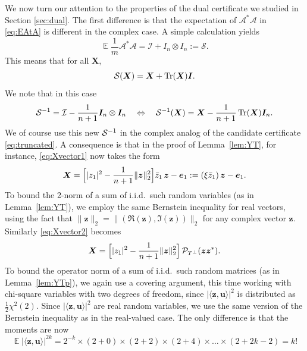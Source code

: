 \documentclass[11pt]{article}
\newcommand{\<}{\langle}
\renewcommand{\>}{\rangle}
\newcommand{\E}{\operatorname{\mathbb{E}}}
\newcommand{\bX}{\bm{X}}
\newcommand{\bI}{\bm{I}}
\newcommand{\bu}{\bm{u}}
\newcommand{\be}{\bm{e}}
\newcommand{\bz}{\bm{z}}
\newcommand{\tr}{\operatorname{Tr}}
\numberwithin{equation}{section}
\newcommand{\cA}{\mathcal{A}}
\begin{document}
We now turn our attention to the properties of the dual certificate we
studied in Section \ref{sec:dual}. The first difference is that the
expectation of $\cA^* \cA$ in \eqref{eq:EAtA} is different in the
complex case. A simple calculation yields
\[
\E \frac{1}{m} \cA^* \cA =  \mathcal{I} + I_n \otimes I_n := \mathcal{S}.
\]
This means that for all $\bX$,
\begin{equation}
\label{eq:SC}
\cS(\bX) = \bX + \tr(\bX) \bI.
\end{equation}
We note that in this case
\begin{equation}
\label{eq:SinvC}
\cS^{-1} = \mathcal{I} - \frac{1}{n+1} \bI_n \otimes \bI_n
\quad \Leftrightarrow \quad \cS^{-1}(\bX) =  \bX -
\frac{1}{n+1} \tr(\bX) \bI_n.
\end{equation}
We of course use this new $\mathcal{S}^{-1}$ in the complex analog of the
candidate certificate \eqref{eq:truncated}.  A consequence is that
in the proof of Lemma~\ref{lem:YT}, for instance, \eqref{eq:Xvector1}
now takes the form
\begin{equation}
\label{eqLXvector1C}
\bX =   \Bigl[|z_1|^2 - \frac{1}{n+1} \|\bz\|_2^2\Bigr] \bar{z}_1 \,  \bz -
\be_1
:= (\xi \bar{z}_1)\, \bz - \be_1.
\end{equation}
To bound the 2-norm of a sum of i.i.d.\ such random variables (as in Lemma~\ref{lem:YT}), we employ the same Bernstein inequality for real vectors, 
using the fact that $\|\bz\|_2 = \|(\Re(\bz),\Im(\bz))\|_2$ for any complex
vector $\bz$.
Similarly \eqref{eq:Xvector2} becomes
\begin{equation}
\label{eq:Xvector2C}
\bX =  \Bigl[|z_1|^2 - \frac{1}{n+1} \|\bz\|_2^2\Bigr] \, \PTp(\bz \bz^*).
\end{equation}
To bound the operator norm of a sum of i.i.d.\ such random matrices (as in Lemma~\ref{lem:YTp}), 
we again use a covering argument, this time working with chi-square variables with two
degrees of freedom, since $|\langle \bz,\bu \rangle|^2$ is distributed as
$\frac{1}{2}\chi^2(2)$.  Since $|\langle \bz,\bu \rangle|^2$ are real random variables,
we use the same version of the Bernstein inequality as in the real-valued case.  The only difference is that 
the moments  are now
$$
\E |\<\bz,\bu\>|^{2k} = 2^{-k} \times (2+0) \times (2+2) \times (2+4) \times
\ldots \times (2 + 2k-2) = k!
$$
\end{document}
